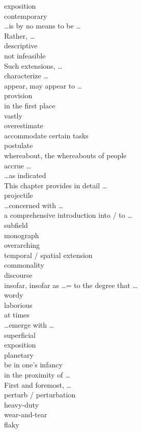 \documentclass[12pt]{article}
\begin{document}
exposition \\
contemporary \\
\dots is by no means to be \dots \\
Rather, \dots \\
descriptive \\
not infeasible \\
Such extensions, \dots \\
characterize \dots \\
appear, may appear to \dots \\
provision \\
in the first place \\
vastly \\
overestimate \\
accommodate certain tasks \\
postulate \\
whereabout, the whereabouts of people \\
accrue \dots \\
\dots as indicated \\
This chapter provides in detail \dots \\
projectile \\
\dots concerned with \dots \\
a comprehensive introduction into / to \dots \\
subfield \\
monograph \\
overarching \\
temporal / spatial extension \\
commonality \\
discourse \\
insofar, insofar as \dots = to the degree that \dots \\
wordy \\
laborious \\
at times \\
\dots emerge with \dots \\
superficial \\
exposition \\
planetary \\
be in one's infancy \\
in the proximity of \dots \\
First and foremost, \dots \\
perturb / perturbation \\
heavy-duty \\
wear-and-tear \\
flaky \\
\end{document}
